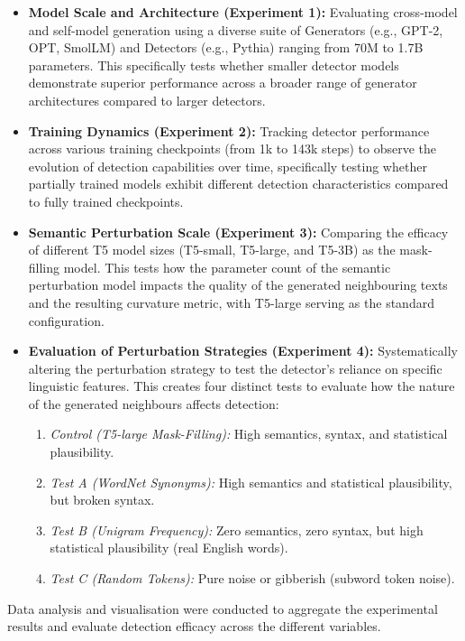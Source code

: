 \documentclass[a4paper,11pt]{article}
\begin{document}
\begin{itemize}
    \item \textbf{Model Scale and Architecture (Experiment 1):} Evaluating cross-model and self-model generation using a diverse suite of Generators (e.g., GPT-2, OPT, SmolLM) and Detectors (e.g., Pythia) ranging from 70M to 1.7B parameters. This specifically tests whether smaller detector models demonstrate superior performance across a broader range of generator architectures compared to larger detectors.
    \item \textbf{Training Dynamics (Experiment 2):} Tracking detector performance across various training checkpoints (from 1k to 143k steps) to observe the evolution of detection capabilities over time, specifically testing whether partially trained models exhibit different detection characteristics compared to fully trained checkpoints.
    \item \textbf{Semantic Perturbation Scale (Experiment 3):} Comparing the efficacy of different T5 model sizes (T5-small, T5-large, and T5-3B) as the mask-filling model. This tests how the parameter count of the semantic perturbation model impacts the quality of the generated neighbouring texts and the resulting curvature metric, with T5-large serving as the standard configuration.
    \item \textbf{Evaluation of Perturbation Strategies (Experiment 4):} Systematically altering the perturbation strategy to test the detector's reliance on specific linguistic features. This creates four distinct tests to evaluate how the nature of the generated neighbours affects detection:
    \begin{enumerate}
        \item \textit{Control (T5-large Mask-Filling):} High semantics, syntax, and statistical plausibility.
        \item \textit{Test A (WordNet Synonyms):} High semantics and statistical plausibility, but broken syntax.
        \item \textit{Test B (Unigram Frequency):} Zero semantics, zero syntax, but high statistical plausibility (real English words).
        \item \textit{Test C (Random Tokens):} Pure noise or gibberish (subword token noise).
    \end{enumerate}
\end{itemize}

Data analysis and visualisation were conducted to aggregate the experimental results and evaluate detection efficacy across the different variables.
\end{document}
